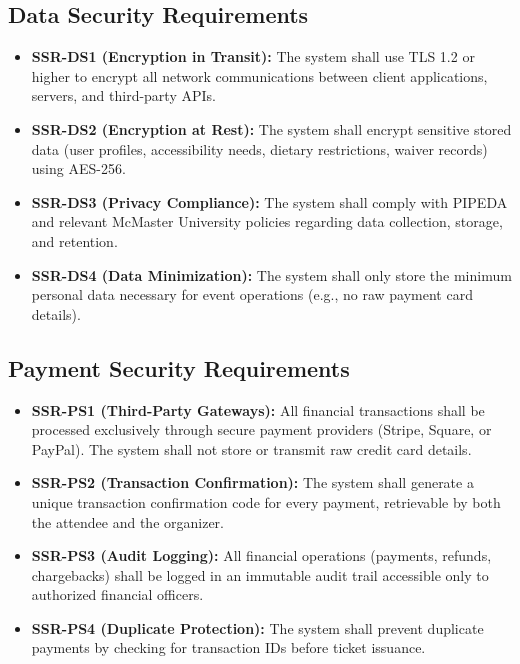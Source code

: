 \documentclass{article}
\begin{document}
\subsection{Data Security Requirements}
\begin{itemize}
    \item \textbf{SSR-DS1 (Encryption in Transit):} The system shall use TLS 1.2 or higher to encrypt all network communications between client applications, servers, and third-party APIs.
    \item \textbf{SSR-DS2 (Encryption at Rest):} The system shall encrypt sensitive stored data (user profiles, accessibility needs, dietary restrictions, waiver records) using AES-256.
    \item \textbf{SSR-DS3 (Privacy Compliance):} The system shall comply with PIPEDA and relevant McMaster University policies regarding data collection, storage, and retention.
    \item \textbf{SSR-DS4 (Data Minimization):} The system shall only store the minimum personal data necessary for event operations (e.g., no raw payment card details).
\end{itemize}

\subsection{Payment Security Requirements}
\begin{itemize}
    \item \textbf{SSR-PS1 (Third-Party Gateways):} All financial transactions shall be processed exclusively through secure payment providers (Stripe, Square, or PayPal). The system shall not store or transmit raw credit card details.
    \item \textbf{SSR-PS2 (Transaction Confirmation):} The system shall generate a unique transaction confirmation code for every payment, retrievable by both the attendee and the organizer.
    \item \textbf{SSR-PS3 (Audit Logging):} All financial operations (payments, refunds, chargebacks) shall be logged in an immutable audit trail accessible only to authorized financial officers.
    \item \textbf{SSR-PS4 (Duplicate Protection):} The system shall prevent duplicate payments by checking for transaction IDs before ticket issuance.
\end{itemize}
\end{document}

